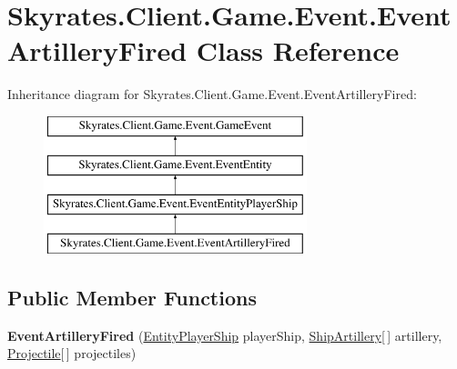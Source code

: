\hypertarget{class_skyrates_1_1_client_1_1_game_1_1_event_1_1_event_artillery_fired}{\section{Skyrates.\-Client.\-Game.\-Event.\-Event\-Artillery\-Fired Class Reference}
\label{class_skyrates_1_1_client_1_1_game_1_1_event_1_1_event_artillery_fired}
}
Inheritance diagram for Skyrates.\-Client.\-Game.\-Event.\-Event\-Artillery\-Fired\-:\begin{figure}[H]
\begin{center}
\leavevmode
\includegraphics[height=4.000000cm]{class_skyrates_1_1_client_1_1_game_1_1_event_1_1_event_artillery_fired}
\end{center}
\end{figure}
\subsection*{Public Member Functions}
\begin{DoxyCompactItemize}
\item 
\hypertarget{class_skyrates_1_1_client_1_1_game_1_1_event_1_1_event_artillery_fired_a097679a836c7701fc77f76fd5f375ce2}{{\bfseries Event\-Artillery\-Fired} (\hyperlink{class_skyrates_1_1_client_1_1_entity_player_ship}{Entity\-Player\-Ship} player\-Ship, \hyperlink{class_skyrates_1_1_client_1_1_ship_1_1_ship_artillery}{Ship\-Artillery}\mbox{[}$\,$\mbox{]} artillery, \hyperlink{class_projectile}{Projectile}\mbox{[}$\,$\mbox{]} projectiles)}\label{class_skyrates_1_1_client_1_1_game_1_1_event_1_1_event_artillery_fired_a097679a836c7701fc77f76fd5f375ce2}

\end{DoxyCompactItemize}
